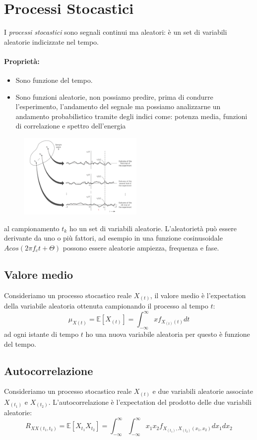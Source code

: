 \section{Processi Stocastici}
    I \emph{processi stocastici} sono segnali continui ma aleatori: è un set di variabili aleatorie indicizzate nel tempo.
    \paragraph{Proprietà:}
        \begin{itemize}
            \item {Sono funzione del tempo.}
            \item {Sono funzioni aleatorie, non possiamo predire, prima di condurre l'esperimento, l'andamento del segnale ma 
            possiamo analizzarne un andamento probabilistico tramite degli indici come: potenza media, funzioni di correlazione e spettro dell'energia}
        \end{itemize} 
        \begin{figure}[H]
            \centering
            \includegraphics[width = 6cm]{media/processi stocastici.png}
        \end{figure}
        al campionamento $t_k$ ho un set di variabili aleatorie. L'aleatorietà può essere derivante da uno o più fattori,
        ad esempio in una funzione cosinusoidale $Acos(2\pi f_ct+\Theta)$ possono essere aleatorie ampiezza, frequenza e fase.

    \subsection{Valore medio}
        Consideriamo un processo stocastico reale $X_{(t)}$, il valore medio è l'expectation della variabile aleatoria ottenuta campionando
        il processo al tempo $t$:
            \[
                \mu_{X(t)} = \mathbb{E}[X_{(t)}] = \int_{-\infty}^{\infty}xf_{X_{(t)}(t)}dt
            \]
        ad ogni istante di tempo $t$ ho una nuova variabile aleatoria per questo è funzione del tempo.
    \subsection{Autocorrelazione}
        Consideriamo un processo stocastico reale $X_{(t)}$ e due variabili aleatorie associate $X_{(t_1)}$ e $X_{(t_2)}$. 
        L'autocorrelazione è l'expectation del prodotto delle due variabili aleatorie:
        \[
            R_{XX(t_1,t_2)} = \mathbb{E}[X_{t_1}X_{t_2}] = \int_{-\infty}^{\infty}\int_{-\infty}^{\infty} x_1x_2f_{X_{(t_1)},X_{(t_2)}(x_1,x_2)}dx_1dx_2
        \]
